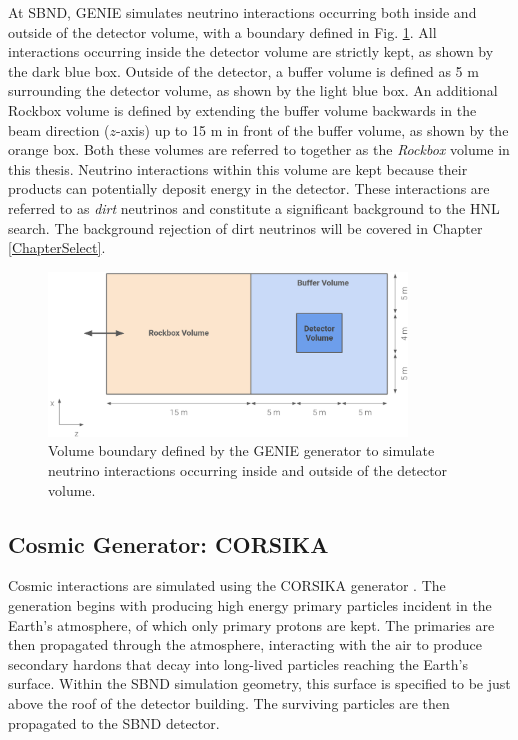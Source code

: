 At SBND, GENIE simulates neutrino interactions occurring both inside and outside of the detector volume, with a boundary defined in Fig. \ref{fig:Rockbox_Volume}.  
All interactions occurring inside the detector volume are strictly kept, as shown by the dark blue box.
Outside of the detector, a buffer volume is defined as 5 m surrounding the detector volume, as shown by the light blue box.                       
An additional Rockbox volume is defined by extending the buffer volume backwards in the beam direction ($z$-axis) up to 15 m in front of the buffer volume, as shown by the orange box.
Both these volumes are referred to together as the \textit{Rockbox} volume in this thesis.
Neutrino interactions within this volume are kept because their products can potentially deposit energy in the detector.
These interactions are referred to as \textit{dirt} neutrinos and constitute a significant background to the HNL search.
The background rejection of dirt neutrinos will be covered in Chapter \ref{ChapterSelect}.

\begin{figure}[htbp!] 
\centering    
\includegraphics[width=0.85\textwidth]{Rockbox_Volume}
\caption[Volume Boundary of the GENIE Generator]{
Volume boundary defined by the GENIE generator to simulate neutrino interactions occurring inside and outside of the detector volume. 
}
\label{fig:Rockbox_Volume}
\end{figure}

\subsection{Cosmic Generator: CORSIKA}
\label{sec:gen_corsika}

Cosmic interactions are simulated using the CORSIKA generator \cite{corsika}.
The generation begins with producing high energy primary particles incident in the Earth's atmosphere, of which only primary protons are kept. 
The primaries are then propagated through the atmosphere, interacting with the air to produce secondary hardons that decay into long-lived particles reaching the Earth's surface.
Within the SBND simulation geometry, this surface is specified to be just above the roof of the detector building.
The surviving particles are then propagated to the SBND detector.

